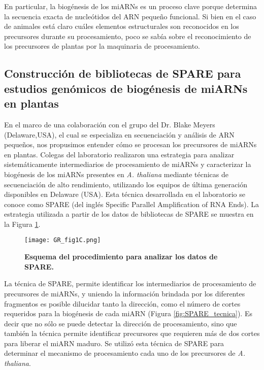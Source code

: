 En particular, la biogénesis de los miARNs es un proceso clave porque determina la secuencia exacta de nucleótidos del ARN pequeño funcional.
Si bien en el caso de animales está claro cuáles elementos estructurales son reconocidos en los precursores durante su procesamiento, poco se sabía sobre el reconocimiento de los precursores de plantas por la maquinaria de procesamiento.

\subsection{Construcción de bibliotecas de SPARE para estudios genómicos de biogénesis de miARNs en plantas}

En el marco de una colaboración con el grupo del Dr. Blake Meyers (Delaware,USA), el cual se especializa en secuenciación y análisis de ARN pequeños, nos propusimos entender cómo se procesan los precursores de miARNs en plantas. 
Colegas del laboratorio realizaron una estrategia para analizar sistemáticamente intermediarios de procesamiento de miARNs y caracterizar la biogénesis de los miARNs presentes en \textit{A. thaliana} mediante técnicas de secuenciación de alto rendimiento, utilizando los equipos de última generación disponibles en Delaware (USA).
Esta técnica desarrollada en el laboratorio se conoce como SPARE \citep{Schapire2013} (del inglés Specific Parallel Amplification of RNA Ends).
La estrategia utilizada a partir de los datos de bibliotecas de SPARE se muestra en la Figura \ref{fig:GR_fig1C}.

\begin{figure}[htbp!] 
    \centering    
    \texttt{[image: GR\_fig1C.png]}
    \caption[Esquema del procedimiento para analizar los datos de SPARE]{
        \textbf{Esquema del procedimiento para analizar los datos de SPARE.}
    }
    \label{fig:GR_fig1C}
\end{figure}

La técnica de SPARE, permite identificar los intermediarios de procesamiento de precursores de miARNs, y uniendo la información brindada por los diferentes fragmentos es posible dilucidar tanto la dirección, como el número de cortes requeridos para la biogénesis de cada miARN (Figura \ref{fig:SPARE_tecnica}).
Es decir que no sólo se puede detectar la dirección de procesamiento, sino que también la técnica permite identificar precursores que requieren más de dos cortes para liberar el miARN maduro.
Se utilizó esta técnica de SPARE para determinar el mecanismo de procesamiento cada uno de los precursores de \textit{A. thaliana}.

